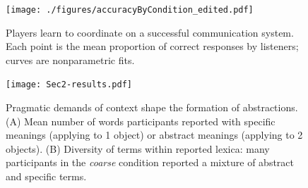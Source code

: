 \begin{figure}[t]
\begin{center}
{\texttt{[image: ./figures/accuracyByCondition\_edited.pdf]}}
{\caption{{Players learn to coordinate on a successful communication system. Each point is the mean proportion of correct responses by listeners; curves are nonparametric fits.  %
\label{fig:context_accuracy}}}}
\vspace{-3ex}
\end{center}
\end{figure}
\begin{figure}[t]
\begin{center}
\texttt{[image: Sec2-results.pdf]}
\caption{Pragmatic demands of context shape the formation of abstractions. (A) Mean number of words participants reported with specific meanings (applying to 1 object) or abstract meanings (applying to 2 objects). (B) Diversity of terms within reported lexica: many participants in the \emph{coarse} condition reported a mixture of abstract and specific terms.}
\label{fig:lexiconContent}
\end{center}
\end{figure}


